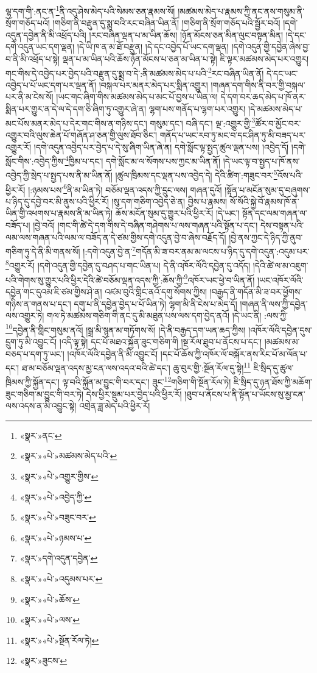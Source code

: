 ལྷ་དག་གི་:ནང་ན་\footnote{«སྣར་»ནང་}ནི་འདུ་ཤེས་མེད་པའི་སེམས་ཅན་རྣམས་སོ། །མཚམས་མེད་པ་རྣམས་ཀྱི་ནང་ནས་གསུམ་ནི་སྲོག་གཅོད་པའོ། །གཅིག་ནི་བརྫུན་དུ་སྨྲ་བའི་རང་བཞིན་ཡིན་ནོ། །གཅིག་ནི་སྲོག་གཅོད་པའི་སྦྱོར་བའོ། །དགེ་འདུན་དབྱེན་ནི་མི་འཕྲོད་པའི། །རང་བཞིན་ལྡན་པ་མ་ཡིན་ཆོས། །ཉོན་མོངས་ཅན་མིན་ལུང་བསྟན་མིན། །དེ་དང་དགེ་འདུན་ཡང་དག་ལྡན། །དེ་ཡི་ཁ་ན་མ་ཐོ་བརྫུན། །དེ་དང་འབྱེད་པོ་ཡང་དག་ལྡན། །དགེ་འདུན་གྱི་དབྱེན་ཞེས་བྱ་བ་ནི་མི་འཕྲོད་པ་སྟེ། ལྡན་པ་མ་ཡིན་པའི་ཆོས་ཉོན་མོངས་པ་ཅན་མ་ཡིན་པ་སྟེ། ཇི་ལྟར་མཚམས་མེད་པར་འགྱུར། གང་གིས་དེ་འབྱེད་པར་བྱེད་པའི་བརྫུན་དུ་སྨྲ་བ་དེ་:ནི་མཚམས་མེད་པ་པའི་\footnote{«སྣར་»«པེ་»མཚམས་མེད་པའི་}རང་བཞིན་ཡིན་ནོ། དེ་དང་ཡང་འབྱེད་པ་པོ་ཡང་དག་པར་ལྡན་ནོ། །བསྐལ་པར་མནར་མེད་པར་སྨིན་འགྱུར། །གཞན་དག་གིས་ནི་བར་གྱི་བསྐལ་པར་ནི་མ་ངེས་སོ། །ཡང་གང་ཞིག་གིས་མཚམས་མེད་པ་མང་པོ་བྱས་པ་ཡིན་ལ། དེ་དག་བར་ཆད་མེད་པ་ཁོ་ནར་སྨིན་པར་གྱུར་ན་དེ་ལ་དེ་དག་ཅི་ཞིག་ཏུ་འགྱུར་ཞེ་ན། ལྷག་པས་གནོད་པ་ལྷག་པར་འགྱུར། །དེ་མཚམས་མེད་པ་མང་པོས་མནར་མེད་པ་དེར་གང་གིས་ན་གཉིས་དང་། གསུམ་དང་། བཞི་དང་། ལྔ་:འགྱུར་གྱི་\footnote{«སྣར་»«པེ་»འགྱུར་གྱིས་}ཚོར་བ་མྱོང་བར་འགྱུར་བའི་ལུས་ཆེན་པོ་གཞོན་ཤ་ཅན་གྱི་ལུས་ཐོབ་ཅིང་། གནོད་པ་ཡང་རབ་ཏུ་མང་བ་དང་ཤིན་ཏུ་མི་བཟད་པར་འགྱུར་རོ། །དགེ་འདུན་འབྱེད་པར་བྱེད་པ་དེ་སུ་ཞིག་ཡིན་ཞེ་ན། དགེ་སློང་ལྟ་སྤྱད་ཚུལ་ལྡན་པས། །འབྱེད་དོ། །དགེ་སློང་གིས་:འབྱེད་ཀྱིས་\footnote{«སྣར་»«པེ་»འབྱེད་ཀྱི་}ཁྱིམ་པ་དང་། དགེ་སློང་མ་ལ་སོགས་པས་ཀྱང་མ་ཡིན་ནོ། །དེ་ཡང་ལྟ་བ་སྤྱད་པ་ཁོ་ནས་འབྱེད་ཀྱི་སྲེད་པ་སྤྱད་པས་ནི་མ་ཡིན་ནོ། །ཚུལ་ཁྲིམས་དང་ལྡན་པས་འབྱེད་དེ། དེའི་ཚིག་:གཟུང་བར་\footnote{«སྣར་»«པེ་»བཟུང་བར་}འོས་པའི་ཕྱིར་རོ། །:ཉམས་པས་\footnote{«སྣར་»«པེ་»ཉམས་པ་}ནི་མ་ཡིན་ཏེ། བཅོམ་ལྡན་འདས་ཀྱི་དྲུང་ལས། གཞན་དུའོ། །སྟོན་པ་མངོན་སུམ་དུ་བཞུགས་པ་ཉིད་དུ་དབྱེ་བར་མི་ནུས་པའི་ཕྱིར་རོ། །སུ་དག་གཅིག་འབྱེད་ཅེ་ན། བྱིས་པ་རྣམས། སོ་སོའི་སྐྱེ་བོ་རྣམས་ཁོ་ན་ཡིན་གྱི་འཕགས་པ་རྣམས་ནི་མ་ཡིན་ཏེ། ཆོས་མངོན་སུམ་དུ་གྱུར་པའི་ཕྱིར་རོ། །དེ་ཡང་། སྟོན་དང་ལམ་གཞན་ལ་བཟོད་པ། །བྱེ་བའོ། །གང་གི་ཚེ་དེ་དག་གིས་དེ་བཞིན་གཤེགས་པ་ལས་གཞན་པའི་སྟོན་པ་དང་། དེས་བསྟན་པའི་ལམ་ལས་གཞན་པའི་ལམ་ལ་བཟོད་ན་དེ་ཙམ་གྱིས་དགེ་འདུན་བྱེ་བ་ཞེས་བརྗོད་དོ། །བྱེ་ནས་ཀྱང་དེ་ཉིད་ཀྱི་ནུབ་གཅིག་ཏུ་དེ་ནི་མི་གནས་སོ། །:དགེ་འདུན་བྱེ་ན་\footnote{«སྣར་»དགེ་འདུན་དབྱེན་}གདོན་མི་ཟ་བར་ནམ་མ་ལངས་པ་ཉིད་དུ་དགེ་འདུན་:འདུམ་པར་\footnote{«སྣར་»«པེ་»འདུམས་པར་}འགྱུར་རོ། །དགེ་འདུན་གྱི་དབྱེན་དུ་བཤད་པ་གང་ཡིན་པ། དེ་ནི་འཁོར་ལོའི་དབྱེན་དུ་འདོད། །དེའི་ཚེ་ལ་མ་འཇུག་པའི་གེགས་སུ་གྱུར་པའི་ཕྱིར་དེའི་ཚེ་བཅོམ་ལྡན་འདས་ཀྱི་:ཆོས་ཀྱི་\footnote{«སྣར་»«པེ་»ཆོས་}འཁོར་ཡང་ཕྱེ་བ་ཡིན་ནོ། །ཡང་འཁོར་ལོའི་དབྱེན་གང་དུའམ་ཇི་ཙམ་གྱིས་ཤེ་ན། འཛམ་བུའི་གླིང་ནའོ་དགུ་སོགས་ཀྱིས། །བརྒྱད་ནི་གདོན་མི་ཟ་བར་ཕྱོགས་གཉིས་ན་གནས་པ་དང་། དགུ་པ་ནི་དབྱེན་བྱེད་པ་པོ་ཡིན་ཏེ། ལྷག་མི་ནི་ངེས་པ་མེད་དོ། །གཞན་ནི་ལས་ཀྱི་དབྱེན་ལས་འགྱུར་ཏེ། གལ་ཏེ་མཚམས་གཅིག་གི་ནང་དུ་མི་མཐུན་པས་ལས་དག་བྱེད་ནའོ། །དེ་ཡང་ནི། :ལས་ཀྱི་\footnote{«སྣར་»«པེ་»ལས་}དབྱེན་ནི་གླིང་གསུམ་ནའོ། །སྒྲ་མི་སྙན་མ་གཏོགས་སོ། །དེ་ནི་བརྒྱད་དག་ཡན་ཆད་ཀྱིས། །འཁོར་ལོའི་དབྱེན་དུས་དྲུག་ཏུ་མི་འབྱུང་ངོ། །འདི་ལྟ་སྟེ། དང་པོ་མཐའ་སྐྱོན་ཟུང་གཅིག་གི །སྔ་རོལ་ཐུབ་པ་ནོངས་པ་དང་། །མཚམས་མ་བཅད་པ་དག་ཏུ་ཡང་། །འཁོར་ལོའི་དབྱེན་ནི་མི་འབྱུང་ངོ། །དང་པོ་ཆོས་ཀྱི་འཁོར་ལོ་བསྐོར་ནས་རིང་པོ་མ་ལོན་པ་དང་། ཐ་མ་བཅོམ་ལྡན་འདས་མྱ་ངན་ལས་འདའ་བའི་ཚེ་དང་། ཆུ་བུར་གྱི་:སྔོན་རོལ་དུ་སྟེ།\footnote{«སྣར་»«པེ་»སྔོན་རོལ་ཏེ།} ཇི་སྲིད་དུ་ཚུལ་ཁྲིམས་ཀྱི་སྐྱོན་དང་། ལྟ་བའི་སྐྱོན་མ་བྱུང་གི་བར་དང་། ཟུང་\footnote{«སྣར་»ཟུངས་}གཅིག་གི་སྔོན་རོལ་ཏེ། ཇི་སྲིད་དུ་ཉན་ཐོས་ཀྱི་མཆོག་ཟུང་གཅིག་མ་བྱུང་གི་བར་ཏེ། དེས་ཕྱིར་སྡུམ་པར་བྱེད་པའི་ཕྱིར་རོ། །ཐུབ་པ་ནོངས་པ་ནི་སྟོན་པ་ཡོངས་སུ་མྱ་ངན་ལས་འདས་ན་མི་འབྱུང་སྟེ། འགྲེན་ཟླ་མེད་པའི་ཕྱིར་རོ། 